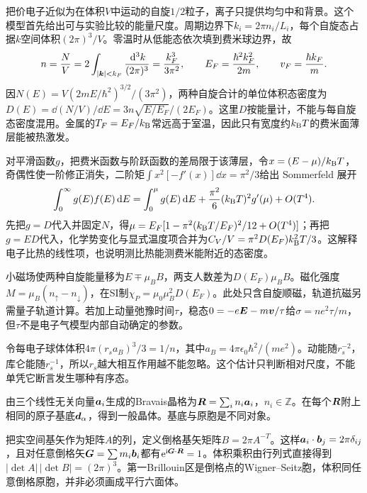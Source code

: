 \label{ch:crystal}
把价电子近似为在体积$V$中运动的自旋$1/2$粒子，离子只提供均匀中和背景。这个模型首先给出可与实验比较的能量尺度。周期边界下$k_i=2\pi n_i/L_i$，每个自旋态占据$k$空间体积$(2\pi)^3/V$。零温时从低能态依次填到费米球边界，故
\begin{equation}
n=\frac NV=2\int_{|\boldsymbol{k}|<k_F}\frac{\,\mathrm d^3k}{(2\pi)^3}=\frac{k_F^3}{3\pi^2},\qquad E_F=\frac{\hbar^2k_F^2}{2m},\qquad v_F=\frac{\hbar k_F}{m}.
\end{equation}
因$N(E)=V(2mE/\hbar^2)^{3/2}/(3\pi^2)$，两种自旋合计的单位体积态密度为$D(E)=\dd(N/V)/\dd E=3n\sqrt{E/E_F}/(2E_F)$。这里$D$按能量计，不能与每自旋态密度混用。金属的$T_F=E_F/k_{\mathrm B}$常远高于室温，因此只有宽度约$k_{\mathrm B} T$的费米面薄层能被热激发。

对平滑函数$g$，把费米函数与阶跃函数的差局限于该薄层，令$x=(E-\mu)/k_{\mathrm B} T$，奇偶性使一阶修正消失，二阶矩$\int x^2[-f'(x)]\dd x=\pi^2/3$给出 Sommerfeld 展开
\begin{equation}
\int_0^\infty g(E)f(E)\,\mathrm d E=\int_0^\mu g(E)\,\mathrm d E+\frac{\pi^2}{6}(k_{\mathrm B} T)^2g'(\mu)+O(T^4).
\end{equation}
先把$g=D$代入并固定$N$，得$\mu=E_F[1-\pi^2(k_{\mathrm B} T/E_F)^2/12+O(T^4)]$；再把$g=ED$代入，化学势变化与显式温度项合并为$C_V/V=\pi^2D(E_F)k_{\mathrm B}^2T/3$。这解释电子比热的线性项，也说明测比热能测费米能附近的态密度。

小磁场使两种自旋能量移为$E\mp\mu_BB$，两支人数差为$D(E_F)\mu_BB$。磁化强度$M=\mu_B(n_\uparrow-n_\downarrow)$，在SI制$\chi_P=\mu_0\mu_B^2D(E_F)$。此处只含自旋顺磁，轨道抗磁另需量子轨道计算。若加上动量弛豫时间$\tau$，稳态$0=-e\boldsymbol{E}-m\boldsymbol{v}/\tau$给$\sigma=ne^2\tau/m$，但$\tau$不是电子气模型内部自动确定的参数。

令每电子球体体积$4\pi(r_sa_B)^3/3=1/n$，其中$a_B=4\pi\epsilon_0\hbar^2/(me^2)$。动能随$r_s^{-2}$，库仑能随$r_s^{-1}$，所以$r_s$越大相互作用越不能忽略。这个估计只判断相对尺度，不能单凭它断言发生哪种有序态。
\begin{definition}
由三个线性无关向量$\boldsymbol{a}_i$生成的Bravais晶格为$\boldsymbol{R}=\sum_i n_i\boldsymbol{a}_i$，$n_i\in\mathbb Z$。在每个$\boldsymbol{R}$附上相同的原子基底$\boldsymbol{d}_\alpha$，得到一般晶体。基底与原胞是不同对象。
\end{definition}
把实空间基矢作为矩阵$A$的列，定义倒格基矢矩阵$B=2\pi A^{-T}$。这样$\boldsymbol{a}_i\cdot\boldsymbol{b}_j=2\pi\delta_{ij}$，且对任意倒格矢$\boldsymbol{G}=\sum m_i\boldsymbol{b}_i$都有$\mathrm e^{\mathrm i\boldsymbol{G}\cdot\boldsymbol{R}}=1$。体积乘积由行列式直接得到$|\det A|\,|\det B|=(2\pi)^3$。第一Brillouin区是倒格点的Wigner--Seitz胞，体积同任意倒格原胞，并非必须画成平行六面体。

